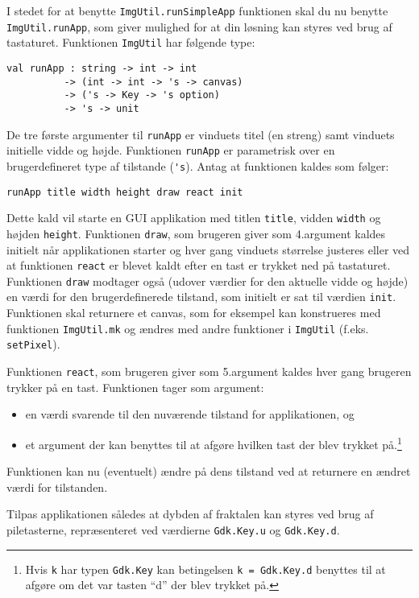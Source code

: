 \label{sierpinskikeys.ov} I stedet for at benytte
  \lstinline{ImgUtil.runSimpleApp} funktionen skal du nu benytte
  \lstinline{ImgUtil.runApp}, som giver mulighed for at din løsning
  kan styres ved brug af tastaturet. Funktionen \lstinline{ImgUtil}
  har følgende type:
\begin{footnotesize}
\begin{lstlisting}[numbers=none,frame=none,mathescape]
val runApp : string -> int -> int
          -> (int -> int -> 's -> canvas)
          -> ('s -> Key -> 's option)
          -> 's -> unit
\end{lstlisting}
\end{footnotesize}
De tre første argumenter til \lstinline{runApp} er vinduets titel (en
streng) samt vinduets initielle vidde og højde. Funktionen
\lstinline{runApp} er parametrisk over en brugerdefineret type af tilstande (\lstinline{'s}). Antag at funktionen kaldes som følger:
\begin{footnotesize}
\begin{lstlisting}[numbers=none,frame=none,mathescape]
  runApp title width height draw react init
\end{lstlisting}
\end{footnotesize}
Dette kald vil starte en GUI applikation med titlen \lstinline{title},
vidden \lstinline{width} og højden \lstinline{height}. Funktionen
\lstinline{draw}, som brugeren giver som 4.\@ argument kaldes initielt
når applikationen starter og hver gang vinduets størrelse justeres
eller ved at funktionen \lstinline{react} er blevet kaldt efter en
tast er trykket ned på tastaturet. Funktionen \lstinline{draw} modtager
også (udover værdier for den aktuelle vidde og højde) en værdi for den
brugerdefinerede tilstand, som initielt er sat til værdien
\lstinline{init}. Funktionen skal returnere et canvas, som for
eksempel kan konstrueres med funktionen \lstinline{ImgUtil.mk} og
ændres med andre funktioner i \lstinline{ImgUtil}
(f.eks. \lstinline{setPixel}).

Funktionen \lstinline{react}, som brugeren giver som 5.\@ argument
kaldes hver gang brugeren trykker på en tast. Funktionen tager som
argument:
\begin{itemize}
\item en værdi svarende til den nuværende tilstand for
applikationen, og
\item et argument der kan benyttes til at afgøre hvilken
tast der blev trykket på.\footnote{Hvis \lstinline{k} har typen
  \lstinline{Gdk.Key} kan betingelsen
  \lstinline{k = Gdk.Key.d} benyttes til at
  afgøre om det var tasten ``d'' der blev trykket på.}
\end{itemize}
Funktionen kan
nu (eventuelt) ændre på dens tilstand ved at returnere en ændret værdi
for tilstanden.

Tilpas applikationen således at dybden af fraktalen kan styres ved
brug af piletasterne, repræsenteret ved værdierne
\lstinline{Gdk.Key.u} og \lstinline{Gdk.Key.d}.
